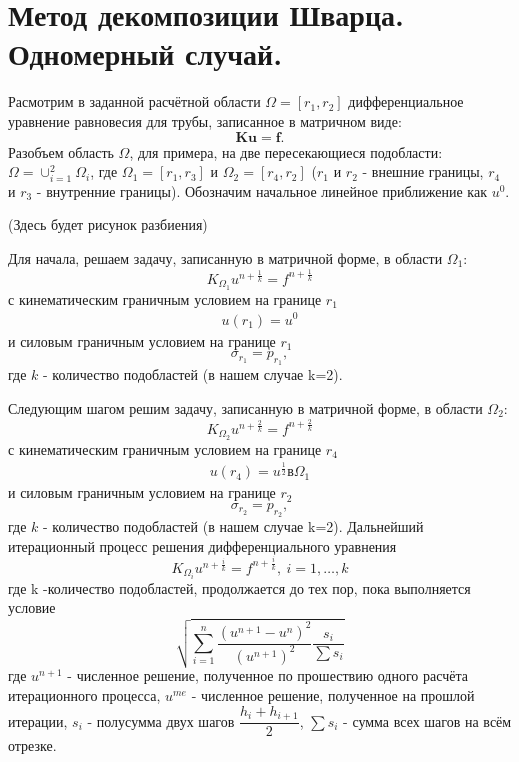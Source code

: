 \documentclass[a4paper,14pt]{extarticle}
\begin{document}
\section{Метод декомпозиции Шварца. Одномерный случай.}

Расмотрим в заданной расчётной области $\Omega=[r_1, r_2]$ дифференциальное уравнение равновесия для трубы, записанное в матричном виде:
\begin{equation}\label{SLAUStandart}
\textbf{Ku}=\textbf{f}.
\end{equation}
Разобъем область $\Omega$, для примера, на две пересекающиеся подобласти: $\Omega=\cup_{i=1}^{2} \Omega_{i}$, где $\Omega_1=[r_1, r_3]$ и $\Omega_2=[r_4, r_2]$ ($r_1$ и $r_2$ - внешние границы, $r_4$ и $r_3$ - внутренние границы). Обозначим начальное линейное приближение как $u^0$.

(Здесь будет рисунок разбиения)

Для начала, решаем задачу, записанную в матричной форме, в области $\Omega_{1}$:
\begin{equation}
K_{\Omega_{1}} u^{n+\frac{1}{k}} = f^{n+\frac{1}{k}}
\end{equation}
с кинематическим граничным условием на границе $r_1$
\begin{align*}
u(r_1)=u^0 
\end{align*}
и силовым граничным условием на границе $r_1$
\begin{equation}
\sigma_{r_1}=p_{r_1},
\end{equation}
где $k$ - количество подобластей (в нашем случае k=2). 

Следующим шагом решим задачу, записанную в матричной форме, в области $\Omega_{2}$:
\begin{equation}
K_{\Omega_{2}} u^{n+\frac{2}{k}} = f^{n+\frac{2}{k}}
\end{equation}
с кинематическим граничным условием на границе $r_4$
\begin{align*}
u(r_4)=u^{\frac{1}{2}} в \Omega_1
\end{align*}
и силовым граничным условием на границе $r_2$
\begin{equation}
\sigma_{r_2}=p_{r_2},
\end{equation}
где $k$ - количество подобластей (в нашем случае k=2). 
Дальнейший итерационный процесс решения дифференциального уравнения 
\begin{equation}
K_{\Omega_{i}} u^{n+\frac{i}{k}} = f^{n+\frac{i}{k}}, \  i=1,\ldots,k
\end{equation}
где k -количество подобластей, продолжается до тех пор, пока выполняется условие
\begin{equation}
\sqrt{\sum_{i=1}^{n} \dfrac{ (u^{n+1}-u^{n})^2}{ (u^{n+1})^2 }\dfrac{s_{i}}{\sum{s_i}}}
\end{equation}
где $u^{n+1}$ - численное решение, полученное по прошествию одного расчёта итерационного процесса, $u^{me}$ - численное решение, полученное на прошлой итерации, $s_i$ - полусумма двух шагов $\dfrac{h_i+h_{i+1}}{2}$, $\sum{s_i}$ - сумма всех шагов на всём отрезке.  
\end{document}
